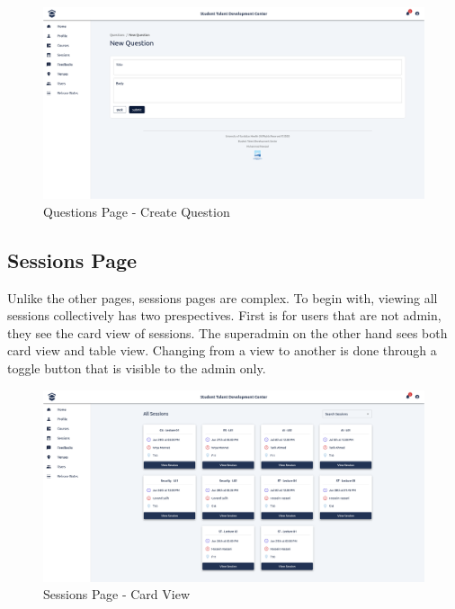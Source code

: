 \begin{justify}
    \begin{figure}[H]
        \centerline{\includegraphics[width=150mm,scale=1]{figures/implementation_and_testing/implementation/frontend/pages/Questions - Create.png}}
        \caption{Questions Page - Create Question}
    \end{figure}



    \clearpage
    \subsection{Sessions Page}\newendline
    Unlike the other pages, sessions pages are complex. To begin with, viewing all sessions collectively has two prespectives. First is for users that are not admin, they see the card view of sessions. The superadmin on the other hand sees both card view and table view. Changing from a view to another is done through a toggle button that is visible to the admin only.

    \begin{figure}[H]
        \centerline{\includegraphics[width=150mm,scale=1]{figures/implementation_and_testing/implementation/frontend/pages/Sessions - All.png}}
        \caption{Sessions Page - Card View}
    \end{figure}


\end{justify}
